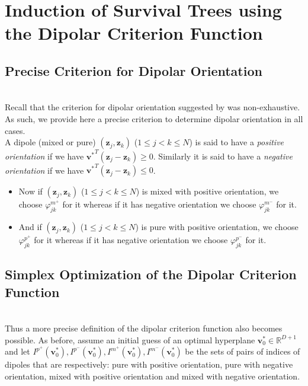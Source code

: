 \documentclass[12pt]{amsart}
\theoremstyle{definition}
\theoremstyle{plain}
\theoremstyle{remark}
\newcommand{\RR}{\mathbb{R}}
\begin{document}
\section{Induction of Survival Trees using the Dipolar Criterion Function}


\subsection{Precise Criterion for Dipolar Orientation} \hfill \\

Recall that the criterion for dipolar orientation suggested by \cite{kretowska} was non-exhaustive. As such, we provide here a precise criterion to determine dipolar orientation in all cases. \\

A dipole (mixed or pure) $(\mathbf{z}_j, \mathbf{z}_k)$ ($1 \leq j < k \leq N$) is said to have a \emph{positive orientation} if we have ${\mathbf{v}^{\ast}}^T (\mathbf{z}_j - \mathbf{z}_k) \geq 0$. Similarly it is said to have a \emph{negative orientation} if we have ${{\mathbf{v}^\ast}}^T (\mathbf{z}_j - \mathbf{z}_k) \leq 0$. \\
	
\begin{itemize}

	\item Now if $(\mathbf{z}_j, \mathbf{z}_k)$ ($1 \leq j < k \leq N$) is mixed with positive orientation, we choose $\varphi^{m^+}_{jk}$ for it whereas if it has negative orientation  we choose $\varphi^{m^-}_{jk}$ for it. \\
	
	\item And if $(\mathbf{z}_j, \mathbf{z}_k)$ ($1 \leq j < k \leq N$) is pure with positive orientation, we choose $\varphi^{p^+}_{jk}$ for it whereas if it has negative orientation  we choose $\varphi^{p^-}_{jk}$ for it. \\
	
\end{itemize}


\subsection{Simplex Optimization of the Dipolar Criterion Function} \hfill \\


Thus a more precise definition of the dipolar criterion function also becomes possible. As before, assume an initial guess of an optimal hyperplane $\mathbf{v}_0^\ast \in \RR^{D + 1}$ and let $I^{p^+}(\mathbf{v}_0^\ast), I^{p^-}(\mathbf{v}_0^\ast), I^{m^+}(\mathbf{v}_0^\ast), I^{m^-}(\mathbf{v}_0^\ast)$ be the sets of pairs of indices of dipoles that are respectively: pure with positive orientation, pure with negative orientation, mixed with positive orientation and mixed with negative orientation. \\
\end{document}
